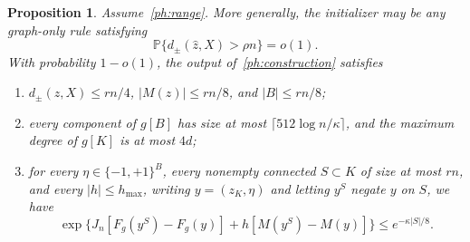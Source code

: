 \documentclass[11pt]{article}
\def\P{\mathbb{P}}
\newtheorem{proposition}[thm]{Proposition}
\numberwithin{equation}{section}
\begin{document}
\begin{proposition}\label{ph:core}
Assume~\eqref{ph:range}. More generally, the initializer may be any graph-only rule satisfying
\[
    \P\{d_\pm(\widehat z,X)>\rho n\}=o(1).
\]
With probability $1-o(1)$, the output of~\eqref{ph:construction} satisfies
\begin{enumerate}[label=(\roman*)]
\item $d_\pm(z,X)\le rn/4$, $|M(z)|\le rn/8$, and $|B|\le rn/8$;
\item every component of $g[B]$ has size at most $\lceil512\log n/\kappa\rceil$, and the maximum degree of $g[K]$ is at most $4d$;
\item for every $\eta\in\{-1,+1\}^B$, every nonempty connected $S\subset K$ of size at most $rn$, and every $|h|\le h_{\max}$, writing $y=(z_K,\eta)$ and letting $y^S$ negate $y$ on $S$, we have
\begin{equation}\label{ph:energy}
 \exp\{J_n[F_g(y^S)-F_g(y)]+h[M(y^S)-M(y)]\}
       \le e^{-\kappa|S|/8}.
\end{equation}
\end{enumerate}
\end{proposition}
\end{document}
